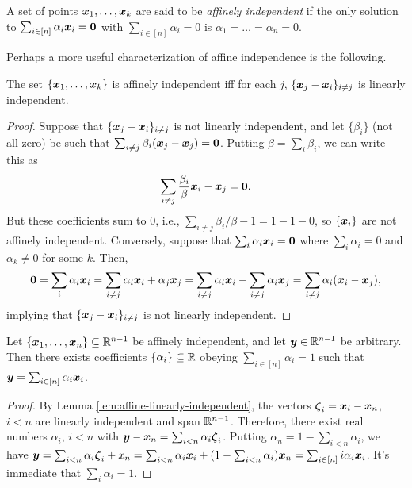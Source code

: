 \begin{definition}
A set of points $\vb*{x}_1,\dots,\vb*{x}_k$ are said to be \emph{affinely independent} if the only solution to $\sum_{i\in[n]}\alpha_i\vb*{x}_i=\vb{0}$ with $\sum_{i\in [n]}\alpha_i=0$ is $\alpha_1=\dots=\alpha_n=0$. 
\end{definition}

Perhaps a more useful characterization of affine independence is the following. 

\begin{lemma}
	\label{lem:affine-linearly-independent}
	The set $\{\vb*{x}_1,\dots,\vb*{x}_k\}$ is affinely independent iff for each $j$, $\{\vb*{x}_j-\vb*{x}_i\}_{i\neq j}$ is linearly independent. 
\end{lemma}
\begin{proof}
	Suppose that $\{\vb*{x}_j-\vb*{x}_i\}_{i\neq j}$ is not linearly independent, and let $\{\beta_i\}$ (not all zero) be such that $\sum_{i\neq j}\beta_i (\vb*{x}_j-\vb*{x}_j)=\vb{0}$. Putting $\beta=\sum_i \beta_i$, we can write this as 
	\[\sum_{i\neq j}\frac{\beta_i}{\beta}\vb*{x}_i - \vb*{x}_j=\vb{0}.\]
	But these coefficients sum to 0, i.e., $\sum_{i\neq j}\beta_i/\beta -1=1-1-0$, so $\{\vb*{x}_i\}$ are not affinely independent. Conversely, suppose that $\sum_i\alpha_i\vb*{x}_i=\vb{0}$ where $\sum_i\alpha_i=0$ and $\alpha_k\neq 0$ for some $k$. Then, 
	\[\vb{0} =\sum_i\alpha_i\vb*{x}_i = \sum_{i\neq j}\alpha_i\vb*{x}_i + \alpha_j\vb*{x}_j = \sum_{i\neq j}\alpha_i\vb*{x}_i - \sum_{i\neq j}\alpha_i\vb*{x}_j = \sum_{i\neq j}\alpha_i(\vb*{x}_i-\vb*{x}_j), \]
	implying that $\{\vb*{x}_j-\vb*{x}_i\}_{i\neq j}$ is not linearly independent. 
\end{proof}

\begin{lemma}
	\label{lem:barycentric_coeffs}
	Let $\{\vb*{x}_1,\dots,\vb*{x}_n\}\subseteq\mathbb{R}^{n-1}$ be affinely independent, and let  $\vb*{y}\in\mathbb{R}^{n-1}$ be arbitrary. Then there exists coefficients $\{\alpha_i\}\subseteq\mathbb{R}$ obeying $\sum_{i\in[n]}\alpha_i=1$ such that $\vb*{y}=\sum_{i\in[n]}\alpha_i\vb*{x}_i$. 
\end{lemma}
\begin{proof}
	By Lemma \ref{lem:affine-linearly-independent}, the vectors $\vb*{\zeta}_i=\vb*{x}_i-\vb*{x}_n$, $i<n$ are linearly independent and span $\mathbb{R}^{n-1}$. Therefore, there exist real numbers $\alpha_i$, $i<n$ with $\vb*{y}-\vb*{x}_n = \sum_{i<n} \alpha_i\vb*{\zeta}_i$. Putting $\alpha_n=1-\sum_{i<n}\alpha_i$, we have $\vb*{y}=\sum_{i<n}\alpha_i\vb*{\zeta}_i + x_n = \sum_{i<n} \alpha_i\vb*{x}_i + (1-\sum_{i<n}\alpha_i)\vb*{x}_n = \sum_{i\in[n]}i \alpha_i\vb*{x}_i$. It's immediate that $\sum_i\alpha_i=1$. 
\end{proof}



